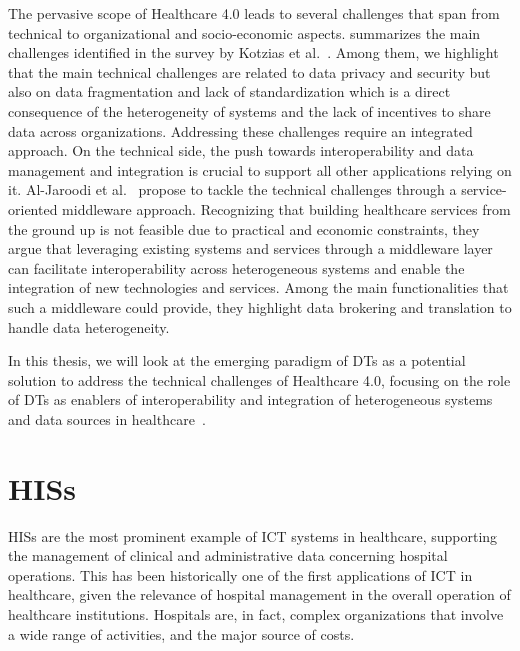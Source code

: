 The pervasive scope of Healthcare 4.0 leads to several challenges that span from technical to organizational and socio-economic aspects. 
%
 summarizes the main challenges identified in the survey by Kotzias et al.~\cite{Kotzias_Bukhsh_Arachchige_Daneva_Abhishta_2022}. 
%
Among them, we highlight that the main technical challenges are related to data privacy and security but also on data fragmentation and lack of standardization which is a direct consequence of the heterogeneity of systems and the lack of incentives to share data across organizations. 
%
Addressing these challenges require an integrated approach. 
%
On the technical side, the push towards interoperability and data management and integration is crucial to support all other applications relying on it.
%
Al-Jaroodi et al.~\cite{Al-Jaroodi_Mohamed_Abukhousa_2020} propose to tackle the technical challenges through a service-oriented middleware approach. 
%
Recognizing that building healthcare services from the ground up is not feasible due to practical and economic constraints, they argue that leveraging existing systems and services through a middleware layer can facilitate interoperability across heterogeneous systems and enable the integration of new technologies and services.
%
Among the main functionalities that such a middleware could provide, they highlight data brokering and translation to handle data heterogeneity. 

In this thesis, we will look at the emerging paradigm of \acp{DT} \cite{Semeraro_Lezoche_Panetto_Dassisti_2021} as a potential solution to address the technical challenges of Healthcare 4.0, focusing on the role of \acp{DT} as enablers of interoperability and integration of heterogeneous systems and data sources in healthcare~\cite{Alazab_Khan_Koppu_Ramu_M_Boobalan_Baker_Maddikunta_Gadekallu_Aljuhani_2023}.


\section{\aclp{HIS}}

\acfp{HIS} are the most prominent example of \ac{ICT} systems in healthcare, supporting the management of clinical and administrative data concerning hospital operations. 
%
This has been historically one of the first applications of \ac{ICT} in healthcare, given the relevance of hospital management in the overall operation of healthcare institutions.
%
Hospitals are, in fact, complex organizations that involve a wide range of activities, and the major source of costs. 

